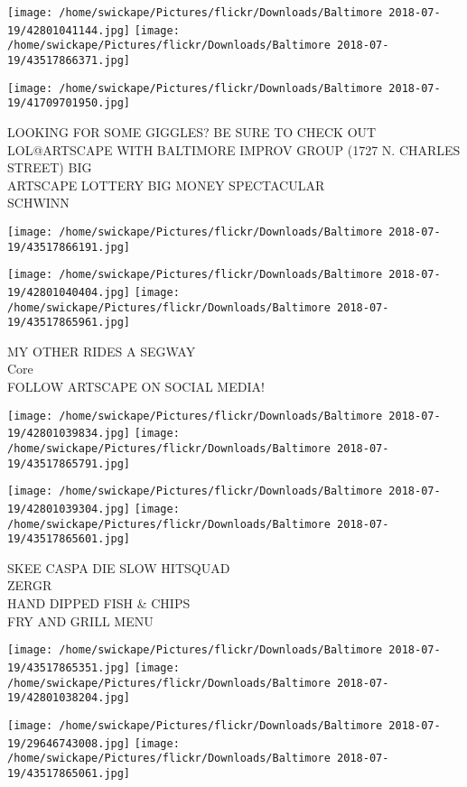 \documentclass[10pt,letterpaper]{article}
\begin{document}
\texttt{[image: /home/swickape/Pictures/flickr/Downloads/Baltimore 2018-07-19/42801041144.jpg]}
\texttt{[image: /home/swickape/Pictures/flickr/Downloads/Baltimore 2018-07-19/43517866371.jpg]}

\texttt{[image: /home/swickape/Pictures/flickr/Downloads/Baltimore 2018-07-19/41709701950.jpg]}

LOOKING FOR SOME GIGGLES?  BE SURE TO CHECK OUT LOL@ARTSCAPE WITH BALTIMORE IMPROV GROUP (1727 N. CHARLES STREET) BIG\\
ARTSCAPE LOTTERY BIG MONEY SPECTACULAR\\
SCHWINN
\pagebreak

\texttt{[image: /home/swickape/Pictures/flickr/Downloads/Baltimore 2018-07-19/43517866191.jpg]}

\vspace{0.25in}
\texttt{[image: /home/swickape/Pictures/flickr/Downloads/Baltimore 2018-07-19/42801040404.jpg]}
\texttt{[image: /home/swickape/Pictures/flickr/Downloads/Baltimore 2018-07-19/43517865961.jpg]}

MY OTHER RIDES A SEGWAY\\
Core\\
FOLLOW ARTSCAPE ON SOCIAL MEDIA!
\pagebreak

\texttt{[image: /home/swickape/Pictures/flickr/Downloads/Baltimore 2018-07-19/42801039834.jpg]}
\texttt{[image: /home/swickape/Pictures/flickr/Downloads/Baltimore 2018-07-19/43517865791.jpg]}

\texttt{[image: /home/swickape/Pictures/flickr/Downloads/Baltimore 2018-07-19/42801039304.jpg]}
\texttt{[image: /home/swickape/Pictures/flickr/Downloads/Baltimore 2018-07-19/43517865601.jpg]}

SKEE CASPA DIE SLOW HITSQUAD\\
ZERGR\\
HAND DIPPED FISH \& CHIPS\\
FRY AND GRILL MENU
\pagebreak

\texttt{[image: /home/swickape/Pictures/flickr/Downloads/Baltimore 2018-07-19/43517865351.jpg]}
\texttt{[image: /home/swickape/Pictures/flickr/Downloads/Baltimore 2018-07-19/42801038204.jpg]}

\texttt{[image: /home/swickape/Pictures/flickr/Downloads/Baltimore 2018-07-19/29646743008.jpg]}
\texttt{[image: /home/swickape/Pictures/flickr/Downloads/Baltimore 2018-07-19/43517865061.jpg]}
\end{document}
